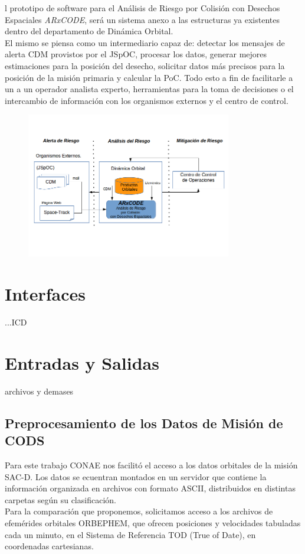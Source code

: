 l prototipo de software para el An\'alisis de Riesgo por Colisi\'on con Desechos Espaciales {\it{ARxCODE}}, ser\'a un sistema anexo a las estructuras ya existentes dentro del departamento de Din\'amica Orbital.\\
El mismo se piensa como un intermediario capaz de: detectar los mensajes de alerta CDM provistos por el JSpOC, procesar los datos, generar mejores estimaciones para la posici\'on del desecho, solicitar datos m\'as precisos para la posici\'on de la misi\'on primaria y calcular la PoC. Todo esto a fin de facilitarle a un a un operador analista experto, herramientas para la toma de decisiones o el intercambio de informaci\'on con los organismos externos y el centro de control.\\

\begin{figure}
  \includegraphics[width=0.8\textwidth]{imagenes/interfasessistemas}
\end{figure}

\section{Interfaces}

...ICD

\section{Entradas y Salidas}

archivos y demases

\subsection*{Preprocesamiento de los Datos de Misi\'on de CODS}
Para este trabajo CONAE nos facilit\'o el acceso a los datos orbitales de la misi\'on SAC-D.
Los datos se ecuentran montados en un servidor que contiene la informaci\'on organizada en archivos con formato ASCII, distribuidos en distintas carpetas seg\'un su clasificaci\'on.\\
Para la comparaci\'on que proponemos, solicitamos acceso a los archivos de efem\'erides orbitales ORBEPHEM, que ofrecen posiciones y velocidades tabuladas cada un minuto, en el Sistema de Referencia TOD (True of Date), en coordenadas cartesianas.

